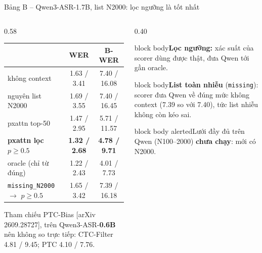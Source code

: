 \documentclass[aspectratio=169,xcolor=table]{beamer}
\newcommand{\bad}[1]{\textcolor{RiskRed}{\textbf{#1}}}
\newcommand{\good}[1]{\textcolor{GoodGreen}{\textbf{#1}}}
\newcommand{\src}[1]{{\tiny\color{TextGray}[#1]}}
\newcommand{\ra}{$\rightarrow$}
\newcommand{\nbox}[2][block body]{\begin{beamercolorbox}[sep=0.45em,rounded=true]{#1}\footnotesize #2\end{beamercolorbox}}
\begin{document}
\begin{frame}{Bảng B -- Qwen3-ASR-1.7B, list N2000: lọc ngưỡng là tốt nhất}
\begin{columns}[T]
\begin{column}{0.58\textwidth}
\centering\footnotesize\setlength{\tabcolsep}{4pt}
\begin{tabular}{lcc}
\toprule
 & WER & B-WER\\
\midrule
không context & 1.63 / 3.41 & 7.40 / 16.08\\
nguyên list N2000 & 1.69 / 3.55 & 7.40 / 16.45\\
pxattn top-50 & 1.47 / 2.95 & 5.71 / 11.57\\
\textbf{pxattn lọc $p\geq0.5$} & \good{1.32 / 2.68} & \good{4.78 / 9.71}\\
oracle (chỉ từ đúng) & 1.22 / 2.43 & 4.01 / 7.73\\
\midrule
\texttt{missing\_N2000} \ra{} $p\geq0.5$ & 1.65 / 3.42 & 7.39 / 16.18\\
\bottomrule
\end{tabular}\par
\vspace{0.15cm}\raggedright
{\scriptsize\color{TextGray} Tham chiếu PTC-Bias \src{arXiv 2609.28727}, trên Qwen3-ASR-\textbf{0.6B} nên không so trực tiếp: CTC-Filter 4.81 / 9.45; PTC 4.10 / 7.76.}
\end{column}
\begin{column}{0.40\textwidth}
\nbox{\textbf{Lọc ngưỡng:} xác suất của scorer dùng được thật, đưa Qwen tới gần oracle.}
\vspace{0.12cm}
\nbox{\textbf{List toàn nhiễu} (\texttt{missing}): scorer đưa Qwen về đúng mức không context (7.39 so với 7.40), tức list nhiễu không còn kéo sai.}
\vspace{0.12cm}
\nbox[block body alerted]{Lưới đầy đủ trên Qwen (N100--2000) \bad{chưa chạy}: mới có N2000.}
\end{column}
\end{columns}
\end{frame}
\end{document}
